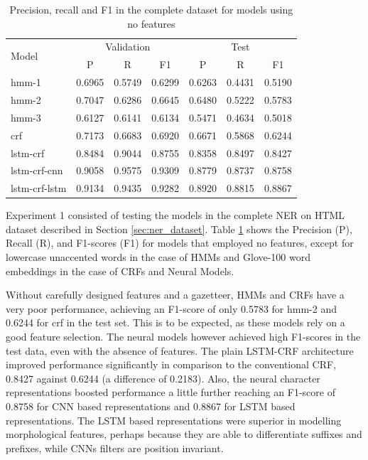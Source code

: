 \documentclass[sigconf]{acmart}
\begin{document}
\begin{table}[h]
  \small
  \begin{center}
    \begin{tabular}{ lllllll }
      \toprule
      \multirow{2}{*}{Model} & \multicolumn{3}{c}{Validation} & \multicolumn{3}{c}{Test} \\
                             & \multicolumn{1}{c}{P} & \multicolumn{1}{c}{R} & \multicolumn{1}{c}{F1}
                             & \multicolumn{1}{c}{P} & \multicolumn{1}{c}{R} & \multicolumn{1}{c}{F1} \\
      \midrule
      hmm-1	    & 0.6965 & 0.5749 & 0.6299 & 0.6263 & 0.4431 & 0.5190 \\
      hmm-2	    & 0.7047 & 0.6286 & 0.6645 & 0.6480 & 0.5222 & 0.5783 \\
      hmm-3	    & 0.6127 & 0.6141 & 0.6134 & 0.5471 & 0.4634 & 0.5018 \\
      crf	    & 0.7173 & 0.6683 & 0.6920 & 0.6671 & 0.5868 & 0.6244 \\
      lstm-crf	    & 0.8484 & 0.9044 & 0.8755 & 0.8358 & 0.8497 & 0.8427 \\
      lstm-crf-cnn  & 0.9058 & 0.9575 & 0.9309 & 0.8779 & 0.8737 & 0.8758 \\
      lstm-crf-lstm & 0.9134 & 0.9435 & 0.9282 & 0.8920 & 0.8815 & 0.8867 \\
      \bottomrule
    \end{tabular}
  \end{center}
  \caption{Precision, recall and F1 in the complete dataset for models using no features}
  \label{tab:experiment1}
\end{table}

Experiment 1 consisted of testing the models in the complete NER on HTML dataset 
described in Section \ref{sec:ner_dataset}. Table \ref{tab:experiment1} shows the 
Precision (P), Recall (R), and F1-scores (F1) for models that employed no features, 
except for lowercase unaccented words
in the case of HMMs and Glove-100 word embeddings in the case of CRFs and Neural Models.

Without carefully designed features and a gazetteer, HMMs and CRFs have a very 
poor performance, achieving an F1-score of only 0.5783 for hmm-2 and 0.6244 for crf
in the test set. This is to be expected, as these models rely on a good feature selection.
The neural models however achieved high F1-scores in the test
data, even with the absence of features. The plain LSTM-CRF architecture improved performance 
significantly in comparison to the conventional CRF, 0.8427 against 0.6244 (a difference 
of 0.2183). Also, the neural character representations boosted performance a little further
reaching an F1-score of 0.8758 for CNN based representations and 0.8867 for LSTM based
representations. The LSTM based representations were superior in modelling
morphological features, perhaps because they are able to differentiate suffixes and prefixes, 
while CNNs filters are position invariant. 
\end{document}
